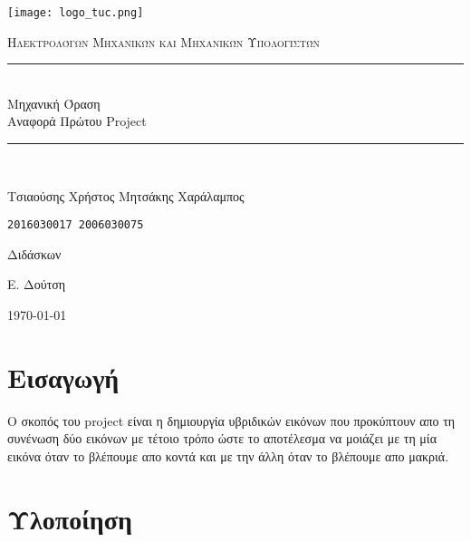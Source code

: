 \documentclass[11pt]{scrartcl} %
\begin{document}
\begin{titlepage}
    \centering
    \texttt{[image: logo\_tuc.png]}\par\vspace{1cm}
    \normalfont\normalsize
    \textsc{\textcolor[rgb]{0.66, 0.09, 0.19}{Ηλεκτρολόγων Μηχανικών και Μηχανικών Υπολογιστών}}\\ %
    \vspace{25pt} %
    \rule{\linewidth}{0.5pt}\\ %
    \vspace{20pt} %
    {\Huge Μηχανική Όραση}\\ %

    {\huge Αναφορά Πρώτου Project}\\ %
    \vspace{12pt} %
    \rule{\linewidth}{2pt}\\ %
    \vspace{12pt} %
    \vspace{2cm}

    {\LARGE{Τσιαούσης Χρήστος \hfill Μητσάκης Χαράλαμπος}
        \par
        \texttt{2016030017 \hfill 2006030075}
        \par
    }

    \vfill
    Διδάσκων

    Ε. Δούτση

    \vfill

    {\large \today\par}
\end{titlepage}

\newpage
\tableofcontents


\section{Εισαγωγή}

Ο σκοπός του project είναι η δημιουργία υβριδικών εικόνων που προκύπτουν απο τη συνένωση δύο εικόνων με τέτοιο τρόπο ώστε το αποτέλεσμα να μοιάζει με τη μία εικόνα όταν το βλέπουμε απο κοντά και με την άλλη όταν το βλέπουμε απο μακριά.

\section{Υλοποίηση}
\end{document}
